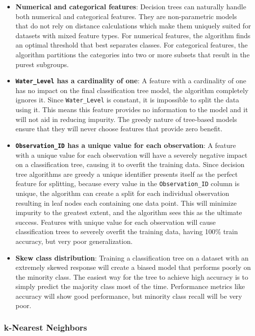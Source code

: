 \documentclass[conference]{IEEEtran}
\begin{document}
\begin{itemize}
    \item \textbf{Numerical and categorical features}: Decision trees can naturally handle both numerical and categorical features. They are non-parametric models that do not rely on distance calculations which make them uniquely suited for datasets with mixed feature types. For numerical features, the algorithm finds an optimal threshold that best separates classes. For categorical features, the algorithm partitions the categories into two or more subsets that result in the purest subgroups.
    \item \textbf{\texttt{Water\_Level} has a cardinality of one}: A feature with a cardinality of one has no impact on the final classification tree model, the algorithm completely ignores it. Since \texttt{Water\_Level} is constant, it is impossible to split the data using it. This means this feature provides no information to the model and it will not aid in reducing impurity. The greedy nature of tree-based models ensure that they will never choose features that provide zero benefit.
    \item \textbf{\texttt{Observation\_ID} has a unique value for each observation}: A feature with a unique value for each observation will have a severely negative impact on a classification tree, causing it to overfit the training data. Since decision tree algorithms are greedy a unique identifier presents itself as the perfect feature for splitting, because every value in the \texttt{Observation\_ID} column is unique, the algorithm can create a split for each individual observation resulting in leaf nodes each containing one data point. This will minimize impurity to the greatest extent, and the algorithm sees this as the ultimate success. Features with unique value for each observation will cause classification trees to severely overfit the training data, having 100\% train accuracy, but very poor generalization.
    \item \textbf{Skew class distribution}: Training a classification tree on a dataset with an extremely skewed response will create a biased model that performs poorly on the minority class. The easiest way for the tree to achieve high accuracy is to simply predict the majority class most of the time. Performance metrics like accuracy will show good performance, but minority class recall will be very poor.
\end{itemize}

\subsubsection{\textbf{k-Nearest Neighbors}}
\end{document}

